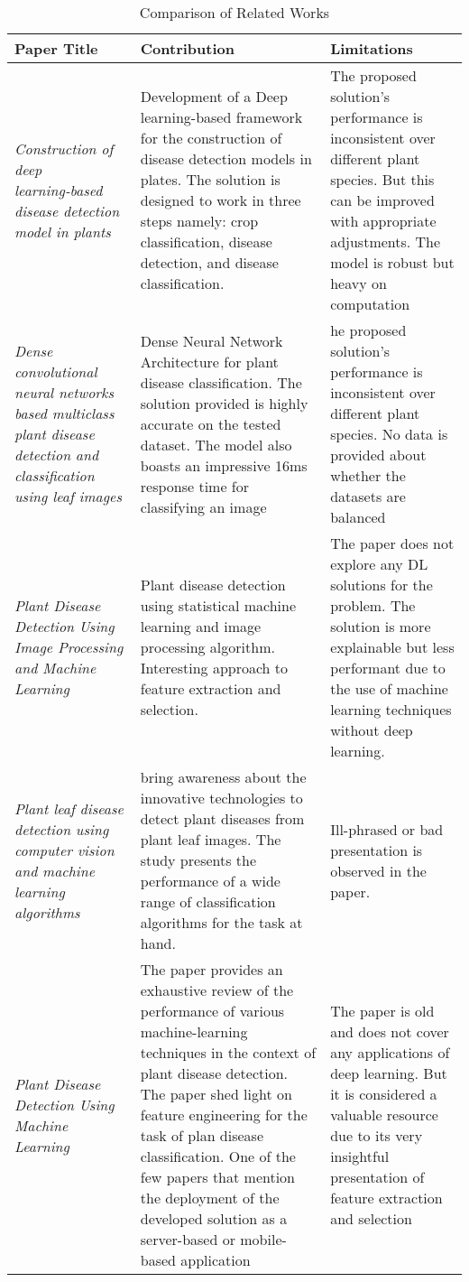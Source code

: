 \begin{table}[h!]
    \centering
    \caption{Comparison of Related Works}
    \begin{tabular}{|p{5cm}|p{5cm}|p{5cm}|}
    \hline
    \textbf{Paper Title} & \textbf{Contribution} & \textbf{Limitations} \\ \hline
    \textit{Construction of deep learning‑based disease detection model in plants} & Development of a Deep learning-based framework for the construction of disease detection models in plates. The solution is designed to work in three steps namely: crop classification, disease detection, and disease classification. & The proposed solution's performance is inconsistent over different plant species. But this can be improved with appropriate adjustments. The model is robust but heavy on computation  \\ \hline

    \textit{Dense convolutional neural networks based multiclass plant disease detection and classification using leaf images} & Dense Neural Network Architecture for plant disease classification. The solution provided is highly accurate on the tested dataset. The model also boasts an impressive 16ms response time for classifying an image & he proposed solution’s performance is inconsistent over different plant species. 
    No data is provided about whether the datasets are balanced
      \\ \hline

      \textit{Plant Disease Detection Using Image Processing and Machine Learning} & Plant disease detection using statistical machine learning and image processing algorithm. Interesting approach to feature extraction and selection. & The paper does not explore any DL solutions for the problem. The solution is more explainable but less performant due to the use of machine learning techniques without deep learning.  \\ \hline


      \textit{Plant leaf disease detection using computer vision and machine learning algorithms} & bring awareness about the innovative technologies to detect plant diseases from plant leaf images. The study presents the performance of a wide range of classification algorithms for the task at hand. & Ill-phrased or bad presentation is observed in the paper. \\ \hline

      \textit{Plant Disease Detection Using Machine Learning} & The paper provides an exhaustive review of the performance of various machine-learning techniques in the context of plant disease detection. The paper shed light on feature engineering for the task of plan disease classification. One of the few papers that mention the deployment of the developed solution as a server-based or mobile-based application & The paper is old and does not cover any applications of deep learning. But it is considered a valuable resource due to its very insightful presentation of feature extraction and selection \\ \hline

    \end{tabular}
    \label{tab:comparison}
\end{table}

